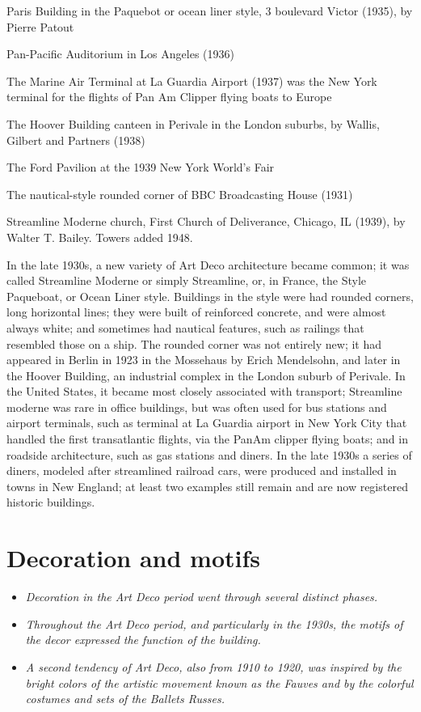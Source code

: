 Paris Building in the Paquebot or ocean liner style, 3 boulevard Victor
(1935), by Pierre Patout

Pan-Pacific Auditorium in Los Angeles (1936)

The Marine Air Terminal at La Guardia Airport (1937) was the New York
terminal for the flights of Pan Am Clipper flying boats to Europe

The Hoover Building canteen in Perivale in the London suburbs, by
Wallis, Gilbert and Partners (1938)

The Ford Pavilion at the 1939 New York World's Fair

The nautical-style rounded corner of BBC Broadcasting House (1931)

Streamline Moderne church, First Church of Deliverance, Chicago, IL
(1939), by Walter T. Bailey. Towers added 1948.

In the late 1930s, a new variety of Art Deco architecture became common;
it was called Streamline Moderne or simply Streamline, or, in France,
the Style Paqueboat, or Ocean Liner style. Buildings in the style were
had rounded corners, long horizontal lines; they were built of
reinforced concrete, and were almost always white; and sometimes had
nautical features, such as railings that resembled those on a ship. The
rounded corner was not entirely new; it had appeared in Berlin in 1923
in the Mossehaus by Erich Mendelsohn, and later in the Hoover Building,
an industrial complex in the London suburb of Perivale. In the United
States, it became most closely associated with transport; Streamline
moderne was rare in office buildings, but was often used for bus
stations and airport terminals, such as terminal at La Guardia airport
in New York City that handled the first transatlantic flights, via the
PanAm clipper flying boats; and in roadside architecture, such as gas
stations and diners. In the late 1930s a series of diners, modeled after
streamlined railroad cars, were produced and installed in towns in New
England; at least two examples still remain and are now registered
historic buildings.

\section{Decoration and motifs}\label{decoration-and-motifs}

\begin{itemize}
\item
  \emph{Decoration in the Art Deco period went through several distinct
  phases.}
\item
  \emph{Throughout the Art Deco period, and particularly in the 1930s,
  the motifs of the decor expressed the function of the building.}
\item
  \emph{A second tendency of Art Deco, also from 1910 to 1920, was
  inspired by the bright colors of the artistic movement known as the
  Fauves and by the colorful costumes and sets of the Ballets Russes.}
\end{itemize}

